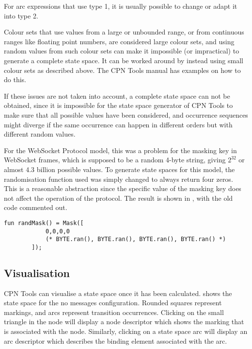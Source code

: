 		For arc expressions that use type 1, it is usually possible to change or
		adapt it into type 2.
		
		Colour sets that use values from a large or unbounded range, or from continuous
		ranges like floating point numbers, are considered large colour sets, and using
		random values from such colour sets can make it impossible (or impractical)
		to generate a complete state space. It can be worked around by
		instead using small colour sets as described above. The CPN Tools manual has
		examples on how to do this.
		
		If these issues are not taken into account, a complete state space can not be
		obtained, since it is impossible for the state space generator of CPN Tools to
		make sure that all possible values have been considered, and occurrence
		sequences might diverge if the same occurrence can happen in different orders but with different
		random values.
		
		For the WebSocket Protocol model, this was a problem for the masking
		key in WebSocket frames, which is supposed to be a random 4-byte string,
		giving $2^{32}$ or almost 4.3 billion possible values.
		To generate state spaces for this model, the randomisation function used was
		simply changed to always return four zeros. This is a reasonable abstraction
		since the specific value of the masking key does not affect the operation of
		the protocol. The result is shown in , with the old
		code commented out.
		
		\begin{lstlisting}[label=lst:fixed_masking_key,gobble=2,caption=Fixed masking
		key] 
		fun	randMask() = Mask([ 
			0,0,0,0
			(* BYTE.ran(), BYTE.ran(), BYTE.ran(), BYTE.ran() *)
		]);
		\end{lstlisting}
	
	\subsection{Visualisation}
	 CPN Tools can visualise a
	state space once it has been calculated.
	 shows the state space for the no messages
	configuration. Rounded squares represent markings, and arcs represent
	transition occurrences. Clicking on the small triangle in the node will display
	a node descriptor which shows the marking that is associated with the node.
	Similarly, clicking on a state space arc will display an arc descriptor which
	describes the binding element associated with the arc. 

